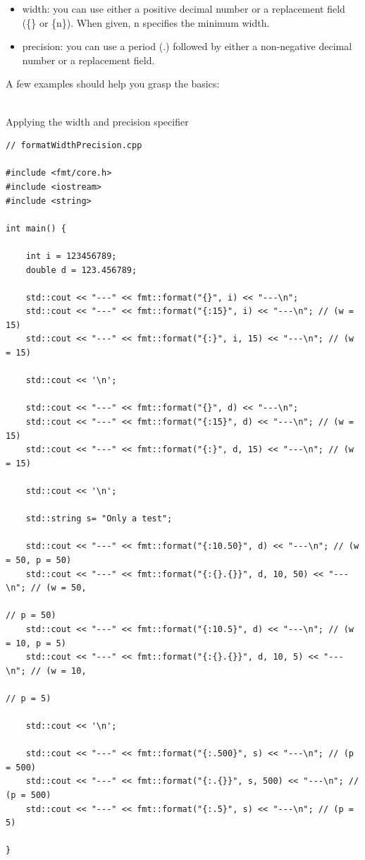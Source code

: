 \begin{itemize}
\item 
width: you can use either a positive decimal number or a replacement field (\{\} or \{n\}). When given, n specifies the minimum width.

\item 
precision: you can use a period (.) followed by either a non-negative decimal number or a replacement field.
\end{itemize}

A few examples should help you grasp the basics:

\hspace*{\fill} \\ %
\noindent
Applying the width and precision specifier
\begin{lstlisting}[style=styleCXX]
// formatWidthPrecision.cpp

#include <fmt/core.h>
#include <iostream>
#include <string>

int main() {

	int i = 123456789;
	double d = 123.456789;
	
	std::cout << "---" << fmt::format("{}", i) << "---\n";
	std::cout << "---" << fmt::format("{:15}", i) << "---\n"; // (w = 15)
	std::cout << "---" << fmt::format("{:}", i, 15) << "---\n"; // (w = 15)
	
	std::cout << '\n';
	
	std::cout << "---" << fmt::format("{}", d) << "---\n";
	std::cout << "---" << fmt::format("{:15}", d) << "---\n"; // (w = 15)
	std::cout << "---" << fmt::format("{:}", d, 15) << "---\n"; // (w = 15)
	
	std::cout << '\n';
	
	std::string s= "Only a test";
	
	std::cout << "---" << fmt::format("{:10.50}", d) << "---\n"; // (w = 50, p = 50)
	std::cout << "---" << fmt::format("{:{}.{}}", d, 10, 50) << "---\n"; // (w = 50,
	                                                                     // p = 50)
	std::cout << "---" << fmt::format("{:10.5}", d) << "---\n"; // (w = 10, p = 5)
	std::cout << "---" << fmt::format("{:{}.{}}", d, 10, 5) << "---\n"; // (w = 10, 
	                                                                    // p = 5)
	
	std::cout << '\n';
	
	std::cout << "---" << fmt::format("{:.500}", s) << "---\n"; // (p = 500)
	std::cout << "---" << fmt::format("{:.{}}", s, 500) << "---\n"; // (p = 500)
	std::cout << "---" << fmt::format("{:.5}", s) << "---\n"; // (p = 5)

}
\end{lstlisting}

